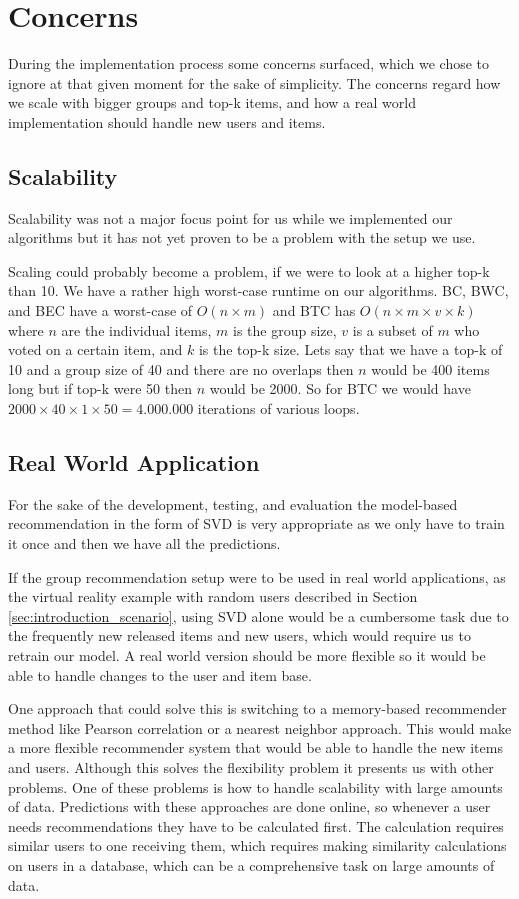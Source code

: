 \section{Concerns}
During the implementation process some concerns surfaced, which we chose to ignore at that given moment for the sake of simplicity. The concerns regard how we scale with bigger groups and top-k items, and how a real world implementation should handle new users and items.

\subsection{Scalability}
Scalability was not a major focus point for us while we implemented our algorithms but it has not yet proven to be a problem with the setup we use. 

Scaling could probably become a problem, if we were to look at a higher top-k than 10. We have a rather high worst-case runtime on our algorithms. BC, BWC, and BEC have a worst-case of $O(n\times m)$ and BTC has $O(n\times m\times v\times k)$ where $n$ are the individual items, $m$ is the group size, $v$ is a subset of $m$ who voted on a certain item, and $k$ is the top-k size. Lets say that we have a top-k of 10 and a group size of 40 and there are no overlaps then $n$ would be 400 items long but if top-k were 50 then $n$ would be 2000. So for BTC we would have $2000 \times 40 \times 1 \times 50 = 4.000.000$ iterations of various loops.
\clearpage
\subsection{Real World Application}
For the sake of the development, testing, and evaluation the model-based recommendation in the form of SVD is very appropriate as we only have to train it once and then we have all the predictions.

If the group recommendation setup were to be used in real world applications, as the virtual reality example with random users described in Section \ref{sec:introduction_scenario}, using SVD alone would be a cumbersome task due to the frequently new released items and new users, which would require us to retrain our model. A real world version should be more flexible so it would be able to handle changes to the user and item base. 

One approach that could solve this is switching to a memory-based recommender method like Pearson correlation or a nearest neighbor approach. This would make a more flexible recommender system that would be able to handle the new items and users. Although this solves the flexibility problem it presents us with other problems. One of these problems is how to handle scalability with large amounts of data\cite{DBLP:conf/adaptive/SchaferFHS07}. Predictions with these approaches are done online, so whenever a user needs recommendations they have to be calculated first. The calculation requires similar users to one receiving them, which requires making similarity calculations on users in a database, which can be a comprehensive task on large amounts of data.

